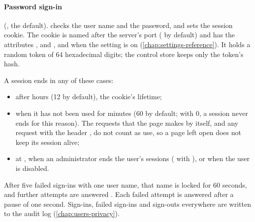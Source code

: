 \paragraph{Password sign-in} (, the default). 
checks the user name and the password, and sets the session cookie. The cookie is named
 after the server's port ( by default) and has the
attributes ,  and , and  when the
setting  is on (\cref{chap:settings-reference}). It holds a random token of
64 hexadecimal digits; the control store keeps only the token's hash.

A session ends in any of these cases:
\begin{itemize}
\item after  hours (12 by default), the cookie's lifetime;
\item when it has not been used for  minutes (60 by default; with
  0, a session never ends for this reason). The requests that the page makes by itself,
   and any request with the header , do not count as
  use, so a page left open does not keep its session alive;
\item at , when an administrator ends the user's sessions
  ( with ), or when the user is disabled.
\end{itemize}

After five failed sign-ins with one user name, that name is locked for 60 seconds, and further
attempts are answered . Each failed attempt is answered after a pause of one second.
Sign-ins, failed sign-ins and sign-outs everywhere are written to the audit log
(\cref{chap:users-privacy}).

